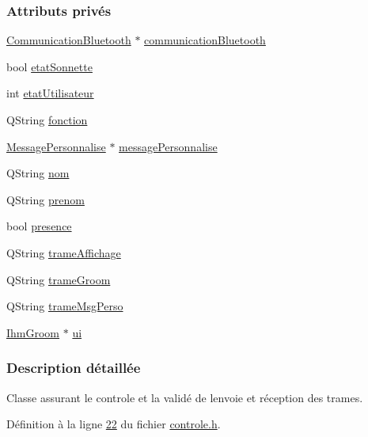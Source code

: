 \subsubsection*{Attributs privés}
\begin{DoxyCompactItemize}
\item 
\hyperlink{class_communication_bluetooth}{Communication\+Bluetooth} $\ast$ \hyperlink{class_controle_a5d818564000173732472eb9ac20e53aa}{communication\+Bluetooth}
\item 
bool \hyperlink{class_controle_afddf1dce812ff88577e308684b564f33}{etat\+Sonnette}
\item 
int \hyperlink{class_controle_a690595803de8f5c172b8bc46122ebb1a}{etat\+Utilisateur}
\item 
Q\+String \hyperlink{class_controle_af733c06309ce63fb9157073574e42b00}{fonction}
\item 
\hyperlink{class_message_personnalise}{Message\+Personnalise} $\ast$ \hyperlink{class_controle_a6240fc19c937146243bcd950e5408481}{message\+Personnalise}
\item 
Q\+String \hyperlink{class_controle_ad47747a49ca21434f6d43d451d3cf134}{nom}
\item 
Q\+String \hyperlink{class_controle_a29e37e25a6fd4643ddea3fef47e3bc51}{prenom}
\item 
bool \hyperlink{class_controle_a089f74f48f24f09e7fc51b03a5ede79e}{presence}
\item 
Q\+String \hyperlink{class_controle_a0bbdd7a0c44fbbc45bf3a381872fcfbe}{trame\+Affichage}
\item 
Q\+String \hyperlink{class_controle_a5b9512ebbaf16746f55a9519de88f9be}{trame\+Groom}
\item 
Q\+String \hyperlink{class_controle_a5cb6dbeb8b2f066b1e757f3c933ea503}{trame\+Msg\+Perso}
\item 
\hyperlink{class_ihm_groom}{Ihm\+Groom} $\ast$ \hyperlink{class_controle_a2dd60c955396dd80426c1a74f56ea611}{ui}
\end{DoxyCompactItemize}


\subsubsection{Description détaillée}
Classe assurant le controle et la validé de l\textquotesingle{}envoie et réception des trames. 

Définition à la ligne \hyperlink{controle_8h_source_l00022}{22} du fichier \hyperlink{controle_8h_source}{controle.\+h}.



